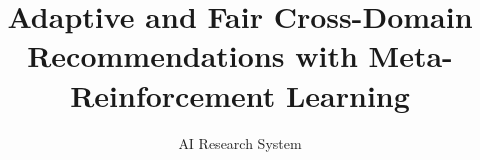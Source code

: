 \documentclass{article} %
\title{Adaptive and Fair Cross-Domain Recommendations with Meta-Reinforcement Learning}
\author{AI Research System}
\begin{document}
\maketitle

\begin{abstract}

\end{abstract}


















\end{document}
